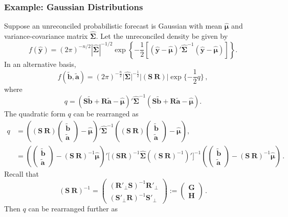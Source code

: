 \documentclass[12pt]{article}
\def\bt{\begin{pmatrix}\tilde{\bm{b}}\\[-0.2cm]\tilde{\bm{a}}\end{pmatrix}}
\theoremstyle{definition}
\begin{document}
\subsubsection*{Example: Gaussian Distributions}

Suppose an unreconciled probabilistic forecast is Gaussian with mean $\hat{\bm{\mu}}$ and variance-covariance matrix $\hat{\bm{\Sigma}}$. Let the unreconciled density be given by
\begin{equation}
f(\hat{\bm{y}})=(2\pi)^{-n/2}|\hat{\bm{\Sigma}}|^{-1/2}\exp\left\{-\frac{1}{2}\left[(\hat{\bm{y}}-\hat{\bm{\mu}})'\hat{\bm{\Sigma}}^{-1}(\hat{\bm{y}}-\hat{\bm{\mu}})\right]\right\}.
\end{equation}
In an alternative basis,
\begin{equation}
f(\tilde{\bm{b}},\tilde{\bm{a}})=(2\pi)^{-\frac{n}{2}}\Big|\hat{\bm{\Sigma}}\Big|^{-\frac{1}{2}}\Big|(\bm{S} ~  \bm{R})\Big|\exp\{-\frac{1}{2}q\}\,,
\end{equation}
where
\begin{equation}
q=(\bm{S}\tilde{\bm{b}}+\bm{R}\tilde{\bm{a}}-\hat{\bm{\mu}})' \hat{\bm{\Sigma}}^{-1}(\bm{S}\tilde{\bm{b}}+\bm{R}\tilde{\bm{a}}-\hat{\bm{\mu}}).
\end{equation}
The quadratic form $q$ can be rearranged as
\begin{align*}
	q& =
	\left((\bm{S} ~  \bm{R})\bt-\hat{\bm{\mu}}\right)' \hat{\bm{\Sigma}}^{-1}\left((\bm{S} ~ \bm{R})\bt-\hat{\bm{\mu}}\right),\\
	& =
	\left(\bt-(\bm{S} ~ \bm{R})^{-1}\hat{\bm{\mu}}\right)' \Big[(\bm{S}  \bm{R})^{-1}\hat{\bm{\Sigma}}\left((\bm{S} ~ \bm{R})^{-1}\right)'\Big]^{-1}
	\left(\bt-(\bm{S} ~ \bm{R})^{-1}\hat{\bm{\mu}}\right)\,.
\end{align*}
Recall that
\[
(\bm{S} ~ \bm{R})^{-1} =
\begin{pmatrix}(\bm{R}'_\bot \bm{S})^{-1}\bm{R}'_\bot  \\ (\bm{S}'_\bot \bm{R})^{-1}\bm{S}'_\bot \end{pmatrix} :=
\begin{pmatrix}
\bm{G} \\\bm{H}
\end{pmatrix}\,.
\]
Then $q$ can be rearranged further as
\end{document}
